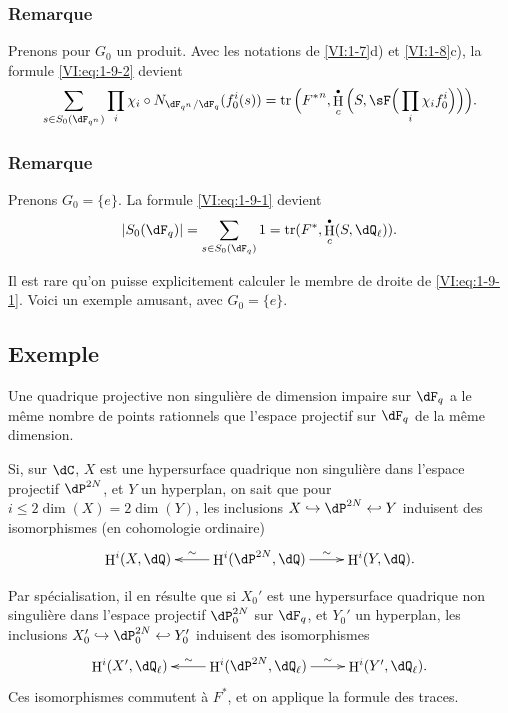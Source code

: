 \documentclass[oneside]{book}
\DeclareMathOperator{\h}{H}
\DeclareMathOperator{\tr}{tr}
\theoremstyle{sga-source}
\theoremstyle{sga-source-dash}
\theoremstyle{sga-source-dotdash}
\theoremstyle{sga-source-number-note-dash}
\theoremstyle{sga-source-note-number-dotdash}
\theoremstyle{sga-source-example-dotdash}
\theoremstyle{sga-source-inline-number}
\theoremstyle{sga-source-bare-number}
\theoremstyle{sga-source}
\let\oldbullet\bullet
\renewcommand{\bullet}{\textnormal{\tiny$\oldbullet$}}
\newcommand{\PrintPage}[1]{}\newcommand{\MathPage}[1]{}\newcommand{\PrintCite}[2]{#1}\newcommand{\var}[3]{#2}
\begin{document}
\addtocounter{subsubsection}{2}
\subsubsection{Remarque}\label{VI:1-9-3}

Prenons pour $G_0$ un produit. Avec les notations de \ref{VI:1-7}d) et 
\ref{VI:1-8}c), la formule \eqref{VI:eq:1-9-2} devient 
\[
  \sum_{s\in S_0(\dF_{q^n})} \prod_i \chi_i\circ N_{\dF_{q^n}/\dF_q} (f_0^i(s)) = \tr\Big({F^\ast}^n, \h_c^\bullet\Big(S,\sF\Big(\prod_i \chi_i f_0^i\Big)\Big)\Big) \text{.}
\]





\subsubsection{Remarque}\label{VI:1-9-4}

Prenons $G_0=\{e\}$. La formule \eqref{VI:eq:1-9-1} devient 
\[
  \left|S_0(\dF_q)\right| = \sum_{s\in S_0(\dF_q)} 1 = \tr(F^\ast,\h_c^\bullet(S,\dQ_\ell)) \text{.}
\]

Il est rare qu'on puisse explicitement calculer le membre de droite de 
\eqref{VI:eq:1-9-1}. Voici un exemple amusant, avec $G_0=\{e\}$. 





\PrintPage{175}
\subsection{Exemple}\label{VI:1-10}

Une quadrique projective non singulière de dimension impaire sur \texorpdfstring{$\dF_q$}{Fq} a le même nombre de points rationnels que l'espace projectif sur \texorpdfstring{$\dF_q$}{Fq} de la même dimension.

Si, sur $\dC$, $X$ est une hypersurface quadrique non singulière dans 
l'espace projectif $\dP^{2 N}$, et $Y$ un hyperplan, on sait que pour 
$i\leqslant 2\dim(X)=2\dim(Y)$, les inclusions 
$X\hookrightarrow \dP^{2 N}\hookleftarrow Y$ induisent des isomorphismes (en 
cohomologie ordinaire) 
\[\xymatrix{
  \h^i(X,\dQ) 
    & \ar[l]_-\sim \h^i(\dP^{2 N},\dQ) \ar[r]^-\sim 
    & \h^i(Y,\dQ) \text{.}
}\]

Par spécialisation, il en résulte que si $X_0'$ est une hypersurface 
quadrique non singulière dans l'espace projectif $\dP_0^{2 N}$ sur $\dF_q$, 
et $Y_0'$ un hyperplan, les inclusions 
$X_0'\hookrightarrow \dP_0^{2 N}\hookleftarrow Y_0'$ induisent des 
isomorphismes 
\[\xymatrix{
  \h^i(X',\dQ_\ell) 
    & \ar[l]_-\sim \h^i(\dP^{2 N},\dQ_\ell) \ar[r]^-\sim 
    & \h^i(Y',\dQ_\ell) \text{.}
}\]
Ces isomorphismes commutent à $F^\ast$, et on applique la formule des traces. 
\end{document}
